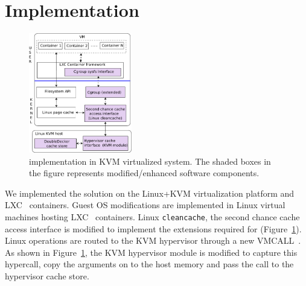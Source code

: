 \section{Implementation}
\label{sec:impl}
\begin{figure}[t]
  \centering
\includegraphics[width=0.4\textwidth]{images/implementation} 
 \caption{\dd{} implementation in KVM virtualized system. The shaded 
 boxes in the figure represents modified/enhanced software components.
}%
 \vspace{-0.5cm}
 \label{fig:impl} 
\end{figure}

We implemented the \dd{} solution on the Linux+KVM virtualization
platform and LXC~\cite{lxc} containers.
%
Guest OS modifications are implemented in Linux virtual machines
hosting LXC~\cite{lxc} containers.
%
Linux \texttt{cleancache}, the second chance cache access interface 
is modified to implement the \cgroup{} extensions required for \dd{} (Figure~\ref{fig:impl}).
%
Linux \cleancache{} operations are routed to the KVM hypervisor through 
a new VMCALL~\cite{intelmanual}.
%
As shown in Figure~\ref{fig:impl}, the KVM hypervisor module is 
modified to capture this hypercall, 
copy the arguments on to the host memory and pass the call to 
the \dd{} hypervisor cache store. 
 

